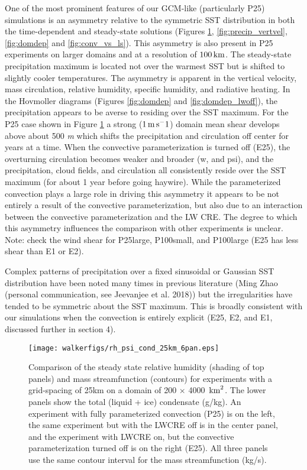 \documentclass[draft]{agujournal2019}
\begin{document}
One of the most prominent features of our GCM-like (particularly P25) simulations is an asymmetry relative to the 
symmetric SST distribution in both the time-dependent and 
steady-state solutions (Figures \ref{fig:rh_psi_P25vsE25},  \ref{fig:precip_vertvel}, \ref{fig:domdep} and  \ref{fig:conv_vs_ls}).  
This asymmetry is also present in P25 experiments on larger domains and at a resolution of $100 \, \rm{km}$. 
The steady-state precipitation maximum is located  not over the warmest SST but is
shifted to slightly cooler temperatures.  The asymmetry is apparent in the vertical velocity, mass circulation, relative humidity, 
specific humidity, and radiative heating.  
In the Hovmoller diagrams (Figures \ref{fig:domdep} and \ref{fig:domdep_lwoff}), the precipitation appears to be averse to 
residing over the SST maximum.  
For the P25 case shown in Figure \ref{fig:rh_psi_P25vsE25} a strong ($1 \, \rm{m \, s^-1}$) domain
mean shear develops above about 500 \textit{m} which shifts the precipitation and circulation off center for years at a time.
When the convective parameterization is turned off (E25), the overturning circulation becomes weaker and 
broader (w, and psi), and the precipitation, cloud fields, and 
circulation all consistently reside over the SST maximum (for about 1 year before going haywire).   
While the parameterized convection plays a large role in driving this asymmetry it appears to be not entirely a 
result of the convective parameterization, but also due to an interaction between the convective 
parameterization and the LW CRE.   The degree to which this asymmetry influences the comparison with other experiments is 
unclear.    Note: check the wind shear for P25large, P100small, and P100large (E25 has less shear than E1 or E2). 

Complex patterns of precipitation over a fixed sinusoidal or Gaussian SST distribution have been noted many times in 
previous literature \cite{Bretherton2006, Wofsy2012} (Ming Zhao (personal communication, see Jeevanjee et al. 2018))
but the irregularities have 
tended to be symmetric about the SST maximum.  This is broadly consistent with our simulations when the convection is 
entirely explicit (E25, E2, and E1, discussed further in section 4).      


\begin{figure}
  \centering
      \texttt{[image: walkerfigs/rh\_psi\_cond\_25km\_6pan.eps]}
      \caption{Comparison of the steady state relative humidity (shading of top panels) and mass 
      streamfunction (contours) for experiments
      with a grid-spacing of 25km on a domain of 200 $\times$ 4000 $\, \rm{km}^2$.  The lower panels 
      show the total (liquid + ice) condensate (g/kg).  
      An experiment with fully parameterized convection (P25) is on the left, the same 
      experiment but with the LWCRE off is in the center panel, and the experiment with LWCRE on, but the convective
      parameterization turned off is on the right (E25).  All three panels use the same contour interval for the mass 
      streamfunction (kg/s).}
  \label{fig:rh_psi_P25vsE25}
\end{figure}
\end{document}
